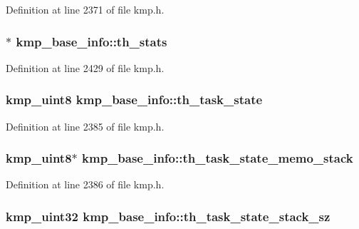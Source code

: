 Definition at line 2371 of file kmp.\-h.

\hypertarget{structkmp__base__info_af78ae2b3f2ff710fe09732ed25d0e7f1}{
\subsubsection[{th\-\_\-stats}]{$\ast$ kmp\-\_\-base\-\_\-info\-::th\-\_\-stats}}\label{structkmp__base__info_af78ae2b3f2ff710fe09732ed25d0e7f1}


Definition at line 2429 of file kmp.\-h.

\hypertarget{structkmp__base__info_aef78a041104c00baf7fbadf6d773ec20}{
\subsubsection[{th\-\_\-task\-\_\-state}]{\setlength{\rightskip}{0pt plus 5cm}kmp\-\_\-uint8 kmp\-\_\-base\-\_\-info\-::th\-\_\-task\-\_\-state}}\label{structkmp__base__info_aef78a041104c00baf7fbadf6d773ec20}


Definition at line 2385 of file kmp.\-h.

\hypertarget{structkmp__base__info_a639cb35ebbee586cab63b1009b58cedd}{
\subsubsection[{th\-\_\-task\-\_\-state\-\_\-memo\-\_\-stack}]{\setlength{\rightskip}{0pt plus 5cm}kmp\-\_\-uint8$\ast$ kmp\-\_\-base\-\_\-info\-::th\-\_\-task\-\_\-state\-\_\-memo\-\_\-stack}}\label{structkmp__base__info_a639cb35ebbee586cab63b1009b58cedd}


Definition at line 2386 of file kmp.\-h.

\hypertarget{structkmp__base__info_acf1b69326c64788ada477ac832f4d80e}{
\subsubsection[{th\-\_\-task\-\_\-state\-\_\-stack\-\_\-sz}]{\setlength{\rightskip}{0pt plus 5cm}kmp\-\_\-uint32 kmp\-\_\-base\-\_\-info\-::th\-\_\-task\-\_\-state\-\_\-stack\-\_\-sz}}\label{structkmp__base__info_acf1b69326c64788ada477ac832f4d80e}


